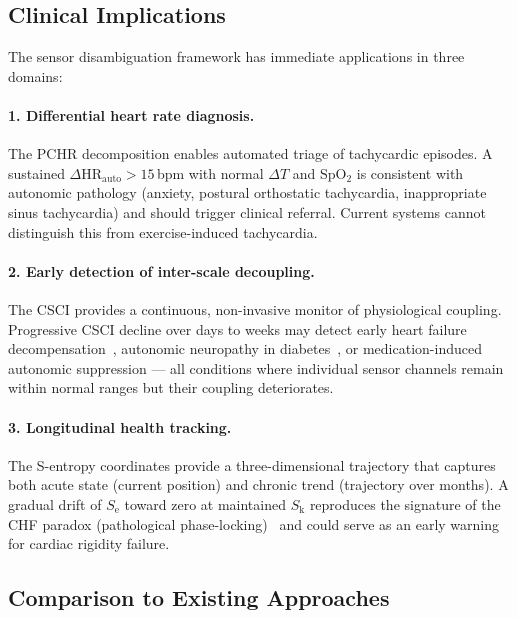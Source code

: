 \documentclass[10pt,twocolumn,a4paper]{article}
\theoremstyle{definition}
\newcommand{\SE}{S_{\text{e}}}
\newcommand{\SK}{S_{\text{k}}}
\begin{document}
\subsection{Clinical Implications}

The sensor disambiguation framework has immediate applications in
three domains:

\paragraph{1. Differential heart rate diagnosis.}
The PCHR decomposition enables automated triage of tachycardic episodes.
A sustained $\Delta\text{HR}_{\text{auto}} > 15$\,bpm with normal
$\Delta T$ and SpO$_2$ is consistent with autonomic pathology (anxiety,
postural orthostatic tachycardia, inappropriate sinus tachycardia) and
should trigger clinical referral. Current systems cannot distinguish
this from exercise-induced tachycardia.

\paragraph{2. Early detection of inter-scale decoupling.}
The CSCI provides a continuous, non-invasive monitor of physiological
coupling. Progressive CSCI decline over days to weeks may detect
early heart failure decompensation~\cite{nolan1998prospective},
autonomic neuropathy in diabetes~\cite{malik1996heart}, or
medication-induced autonomic suppression --- all conditions where
individual sensor channels remain within normal ranges but their
coupling deteriorates.

\paragraph{3. Longitudinal health tracking.}
The S-entropy coordinates provide a three-dimensional trajectory that
captures both acute state (current position) and chronic trend
(trajectory over months). A gradual drift of $\SE$ toward zero at
maintained $\SK$ reproduces the signature of the CHF paradox
(pathological phase-locking)~\cite{goldberger2002fractal,sachikonye2024integration}
and could serve as an early warning for cardiac rigidity failure.

\subsection{Comparison to Existing Approaches}
\end{document}
